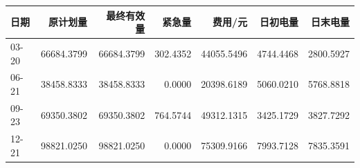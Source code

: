 \begin{tabular}{lrrrrrr}
\toprule
日期 & 原计划量 & 最终有效量 & 紧急量 & 费用/元 & 日初电量 & 日末电量 \\
\midrule
03-20 & 66684.3799 & 66684.3799 & 302.4352 & 44055.5496 & 4744.4468 & 2800.5927 \\
06-21 & 38458.8333 & 38458.8333 & 0.0000 & 20398.6189 & 5060.0210 & 5768.8818 \\
09-23 & 69350.3802 & 69350.3802 & 764.5744 & 49312.1315 & 3425.1729 & 3827.7292 \\
12-21 & 98821.0250 & 98821.0250 & 0.0000 & 75309.9166 & 7993.7128 & 7835.3591 \\
\bottomrule
\end{tabular}
